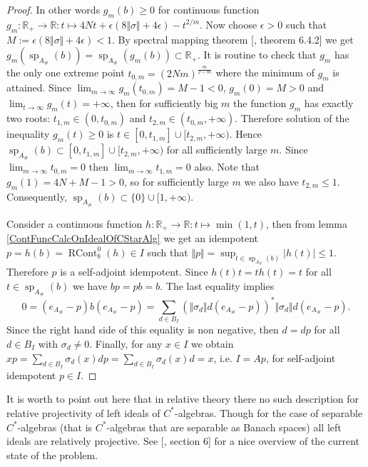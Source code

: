\begin{proof}
In other words $g_m(b)\geq 0$ for continuous function $g_m:\mathbb{R}_+\to\mathbb{R}:t\mapsto 4Nt+\epsilon(8\Vert\sigma\Vert+4\epsilon)-t^{2/m}$. Now choose $\epsilon>0$ such that $M:=\epsilon(8\Vert\sigma\Vert+4\epsilon)<1$.  By spectral mapping theorem [\cite{HelLectAndExOnFuncAn}, theorem 6.4.2] we get $g_m(\operatorname{sp}_{A_\#}(b))=\operatorname{sp}_{A_\#}(g_m(b))\subset\mathbb{R}_+$. It is routine to check that $g_m$ has the only one extreme point $t_{0,m}=(2Nm)^{\frac{m}{2-m}}$ where the minimum of $g_m$ is attained. Since $\lim_{m\to\infty} g_m(t_{0,m})=M-1<0$, $g_m(0)=M>0$ and $\lim_{t\to\infty} g_m(t)=+\infty$, then for sufficiently big $m$ the function $g_m$ has exactly two roots: $t_{1,m}\in(0,t_{0,m})$ and $t_{2,m}\in(t_{0,m},+\infty)$. Therefore solution of the inequality $g_m(t)\geq 0$ is $t\in[0,t_{1,m}]\cup[t_{2,m},+\infty)$. Hence $\operatorname{sp}_{A_\#}(b)\subset[0,t_{1,m}]\cup[t_{2,m},+\infty)$ for all sufficiently large $m$. Since $\lim_{m\to\infty} t_{0,m}=0$ then $\lim_{m\to\infty} t_{1,m}=0$ also. Note that $g_m(1)=4N+M-1>0$, so for sufficiently large $m$ we also have $t_{2,m}\leq 1$. Consequently, $\operatorname{sp}_{A_\#}(b)\subset\{0\}\cup[1,+\infty)$.

Consider a continuous function $h:\mathbb{R}_+\to\mathbb{R}:t\mapsto\min(1, t)$, then from lemma \ref{ContFuncCalcOnIdealOfCStarAlg} we get an idempotent $p=h(b)=\operatorname{RCont}_b^0(h)\in I$ such that $\Vert p\Vert=\sup_{t\in\operatorname{sp}_{A_\#}(b)}|h(t)|\leq 1$. Therefore $p$ is a self-adjoint idempotent. Since $h(t)t=th(t)=t$ for all $t\in \operatorname{sp}_{A_\#}(b)$ we have $bp=pb=b$. The last equality implies
$$
0=(e_{A_\#}-p)b(e_{A_\#}-p)=\sum_{d\in B_I}(\Vert\sigma_d\Vert d(e_{A_\#}-p))^*\Vert\sigma_d\Vert d(e_{A_\#}-p).
$$
Since the right hand side of this equality is non negative, then $d=dp$ for all $d\in B_I$ with $\sigma_d\neq 0$. Finally, for any $x\in I$ we obtain $xp=\sum_{d\in B_I}\sigma_d(x)dp=\sum_{d\in B_I}\sigma_d(x)d=x$, i.e. $I=Ap$, for self-adjoint idempotent $p\in I$.
\end{proof}

It is worth to point out here that in relative theory there no such description for relative projectivity of left ideals of $C^*$-algebras. Though for the case of separable $C^*$-algebras (that is $C^*$-algebras that are separable as Banach spaces) all left ideals are relatively projective. See [\cite{LykProjOfBanAndCStarAlgsOfContFld}, section 6] for a nice overview of the current state of the problem.

